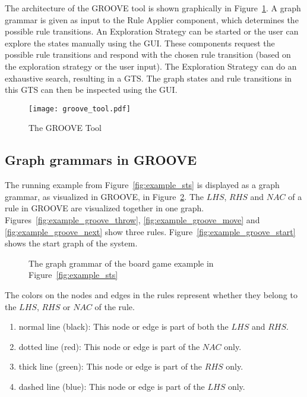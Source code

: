 The architecture of the GROOVE tool is shown graphically in Figure~\ref{fig:groove_tool}. A graph grammar is given as input to the Rule Applier component, which determines the possible rule transitions. An Exploration Strategy can be started or the user can explore the states manually using the GUI. These components request the possible rule transitions and respond with the chosen rule transition (based on the exploration strategy or the user input). The Exploration Strategy can do an exhaustive search, resulting in a GTS. The graph states and rule transitions in this GTS can then be inspected using the GUI.

\begin{figure}[ht]
  \begin{center}
    \texttt{[image: groove\_tool.pdf]}
  \end{center}
  \caption{The GROOVE Tool}
  \label{fig:groove_tool}
\end{figure}

\subsection{Graph grammars in GROOVE}\label{sec:example_groove} 
The running example from Figure~\ref{fig:example_sts} is displayed as a graph grammar, as visualized in GROOVE, in Figure~\ref{fig:example_groove}. The $\mathit{LHS}$, $\mathit{RHS}$ and $\mathit{NAC}$ of a rule in GROOVE are visualized together in one graph. Figures~\ref{fig:example_groove_throw}, \ref{fig:example_groove_move} and \ref{fig:example_groove_next} show three rules. Figure~\ref{fig:example_groove_start} shows the start graph of the system.

\begin{figure}[ht]
  \begin{center}
    \quad
  \end{center}
  \caption{The graph grammar of the board game example in Figure~\ref{fig:example_sts}}
  \label{fig:example_groove}
\end{figure}

The colors on the nodes and edges in the rules represent whether they belong to the $\mathit{LHS}$, $\mathit{RHS}$ or $\mathit{NAC}$ of the rule.
\begin{enumerate}
  \item normal line (black): This node or edge is part of both the $\mathit{LHS}$ and $\mathit{RHS}$.
  \item dotted line (red): This node or edge is part of the $\mathit{NAC}$ only.
  \item thick line (green): This node or edge is part of the $\mathit{RHS}$ only.
  \item dashed line (blue): This node or edge is part of the $\mathit{LHS}$ only.
\end{enumerate}

